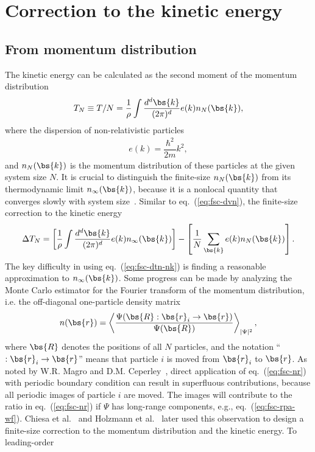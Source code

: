 \section{Correction to the kinetic energy}

\subsection{From momentum distribution}
The kinetic energy can be calculated as the second moment of the momentum distribution
\begin{align} \label{eq:fsc-tn-nk}
T_N \equiv T/N = \frac{1}{\rho}\int \dfrac{d^d\bs{k}}{(2\pi)^d} e(k) n_N(\bs{k}),
\end{align}
where the dispersion of non-relativistic particles
\begin{align}
e(k) = \dfrac{\hbar^2}{2m} k^2,
\end{align}
and $n_N(\bs{k})$ is the momentum distribution of these particles at the given system size $N$. It is crucial to distinguish the finite-size $n_N(\bs{k})$ from its thermodynamic limit $n_{\infty}(\bs{k})$, because it is a nonlocal quantity that converges slowly with system size~\cite{Holzmann2009}.
Similar to eq.~(\ref{eq:fsc-dvn}), the finite-size correction to the kinetic energy
\begin{align} \label{eq:fsc-dtn-nk}
\Delta T_N = \left[
\dfrac{1}{\rho}\int \dfrac{d^d\bs{k}}{(2\pi)^d} e(k)n_{\infty}(\bs{k})
\right] - \left[
\dfrac{1}{N}\sum\limits_{\bs{k}}
e(k)n_N(\bs{k})
\right].
\end{align}
The key difficulty in using eq.~(\ref{eq:fsc-dtn-nk}) is finding a reasonable approximation to $n_{\infty}(\bs{k})$. Some progress can be made by analyzing the Monte Carlo estimator for the Fourier transform of the momentum distribution, i.e. the off-diagonal one-particle density matrix~\cite{W.L.McMillan1965}
\begin{align} \label{eq:fsc-nr}
n(\bs{r}) = \left\langle \dfrac{\Psi(\bs{R}:\bs{r}_i\rightarrow\bs{r})}{\Psi(\bs{R})} \right\rangle_{\vert\Psi\vert^2},
\end{align}
where $\bs{R}$ denotes the positions of all $N$ particles, and the notation ``$:\bs{r}_i\rightarrow\bs{r}$'' means that particle $i$ is moved from $\bs{r}_i$ to $\bs{r}$.
As noted by W.R. Magro and D.M. Ceperley~\cite{Magro1994}, direct application of eq.~(\ref{eq:fsc-nr}) with periodic boundary condition can result in superfluous contributions, because all periodic images of particle $i$ are moved. The images will contribute to the ratio in eq.~(\ref{eq:fsc-nr}) if $\Psi$ has long-range components, e.g., eq.~(\ref{eq:fsc-rpa-wf}). Chiesa et al.~\cite{Chiesa2007} and Holzmann et al.~\cite{Holzmann2009} later used this observation to design a finite-size correction to the momentum distribution and the kinetic energy. To leading-order~\cite{Holzmann2009}
